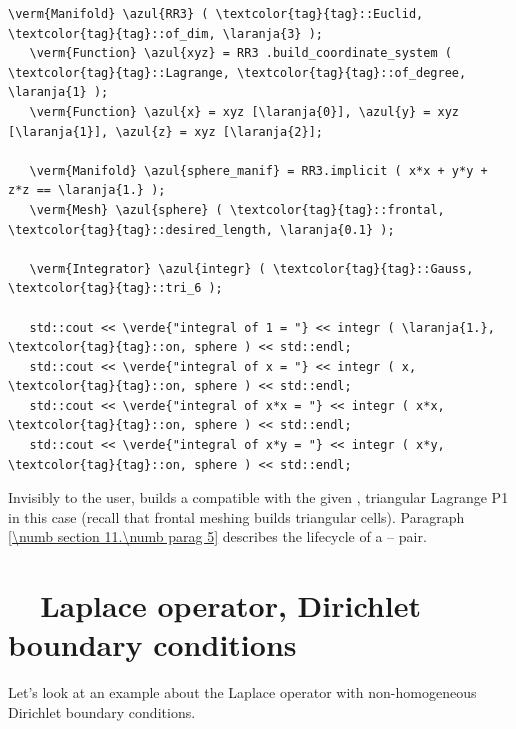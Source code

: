 \begin{Verbatim}[commandchars=\\\{\},formatcom=\small\tt,frame=single,
   label=parag-\ref{\numb section 6.\numb parag 2}.cpp,rulecolor=\color{moldura},
   baselinestretch=0.94,framesep=2mm                                            ]
   \verm{Manifold} \azul{RR3} ( \textcolor{tag}{tag}::Euclid, \textcolor{tag}{tag}::of_dim, \laranja{3} );
   \verm{Function} \azul{xyz} = RR3 .build_coordinate_system ( \textcolor{tag}{tag}::Lagrange, \textcolor{tag}{tag}::of_degree, \laranja{1} );
   \verm{Function} \azul{x} = xyz [\laranja{0}], \azul{y} = xyz [\laranja{1}], \azul{z} = xyz [\laranja{2}];

   \verm{Manifold} \azul{sphere_manif} = RR3.implicit ( x*x + y*y + z*z == \laranja{1.} );
   \verm{Mesh} \azul{sphere} ( \textcolor{tag}{tag}::frontal, \textcolor{tag}{tag}::desired_length, \laranja{0.1} );

   \verm{Integrator} \azul{integr} ( \textcolor{tag}{tag}::Gauss, \textcolor{tag}{tag}::tri_6 );

   std::cout << \verde{"integral of 1 = "} << integr ( \laranja{1.}, \textcolor{tag}{tag}::on, sphere ) << std::endl;
   std::cout << \verde{"integral of x = "} << integr ( x, \textcolor{tag}{tag}::on, sphere ) << std::endl;
   std::cout << \verde{"integral of x*x = "} << integr ( x*x, \textcolor{tag}{tag}::on, sphere ) << std::endl;
   std::cout << \verde{"integral of x*y = "} << integr ( x*y, \textcolor{tag}{tag}::on, sphere ) << std::endl;
\end{Verbatim}

Invisibly to the user, {\maniFEM} builds a {\small\tt{}} compatible with the
given {\small\tt{}}, triangular Lagrange P1 in this case
(recall that frontal meshing builds triangular cells).
Paragraph \ref{\numb section 11.\numb parag 5} describes the lifecycle of a
{\small\tt{}} -- {\small\tt{}} pair.


\section{~~Laplace operator, Dirichlet boundary conditions}\label{\numb section 6.\numb parag 3}

Let's look at an example about the Laplace operator with non-homogeneous Dirichlet
boundary conditions.

